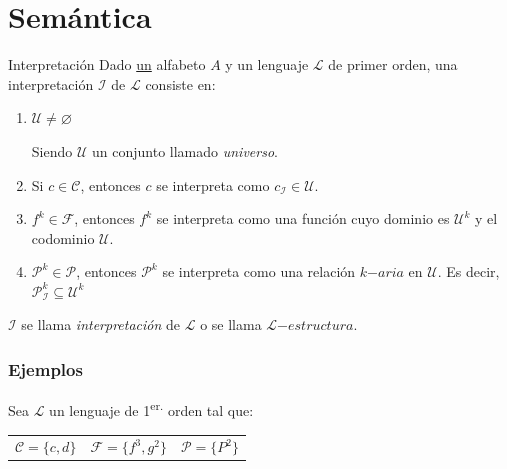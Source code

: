 \section{Semántica}

\begin{definicion}{Interpretación}{}
    Dado \underline{un} alfabeto $A$ y un lenguaje $\mathcal{L}$ de primer
    orden, una interpretación $\mathcal{I}$ de $\mathcal{L}$ consiste en:

    \begin{enumerate}
        \item $\mathcal{U} \neq \varnothing$

            Siendo $\mathcal{U}$ un conjunto llamado \textit{universo}.

        \item Si $c \in \mathcal{C}$, entonces $c$ se interpreta como 
            $c_{\mathcal{I}} \in \mathcal{U}$.

        \item $f^{k} \in \mathcal{F}$, entonces $f^{k}$ se interpreta como una
            función cuyo dominio es $\mathcal{U}^{k}$ y el codominio
            $\mathcal{U}$. 
    
        \item $\mathcal{P}^k \in \mathcal{P}$, entonces $\mathcal{P}^k$ se
            interpreta como una relación $k\mathrm{-}aria$ en $\mathcal{U}$.
            Es decir, $\mathcal{P}_\mathcal{I}^{k} \subseteq \mathcal{U}^k$
    \end{enumerate}

    \medskip

    $\mathcal{I}$ se llama \textit{interpretación} de $\mathcal{L}$ o se llama
   $\mathcal{L}\mathrm{-}estructura$.
\end{definicion}

\subsubsection{Ejemplos}

Sea $\mathcal{L}$ un lenguaje de 1\textsuperscript{er.} orden tal que:

\begin{center}
    \begin{tabular}{c c c}
        $\mathcal{C} = \{ c,d \}$ & $\mathcal{F} = \{ f^3 , g^2 \}$
        & $\mathcal{P} = \{ P^2 \}$
    \end{tabular}
\end{center}

